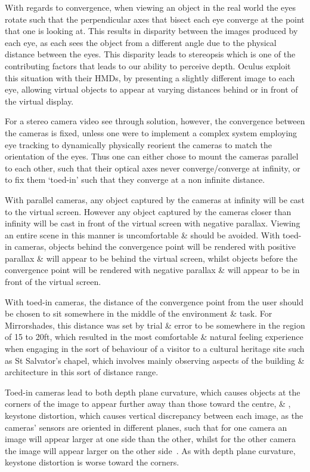 With regards to convergence, when viewing an object in the real world the eyes rotate such that the perpendicular axes that bisect each eye converge at the point that one is looking at. This results in disparity between the images produced by each eye, as each sees the object from a different angle due to the physical distance between the eyes. This disparity leads to stereopsis which is one of the contributing factors that leads to our ability to perceive depth. Oculus exploit this situation with their HMDs, by presenting a slightly different image to each eye, allowing virtual objects to appear at varying distances behind or in front of the virtual display.

For a stereo camera video see through solution, however, the convergence between the cameras is fixed, unless one were to implement a complex system employing eye tracking to dynamically physically reorient the cameras to match the orientation of the eyes. Thus one can either chose to mount the cameras parallel to each other, such that their optical axes never converge/converge at infinity, or to fix them `toed-in' such that they converge at a non infinite distance.

With parallel cameras, any object captured by the cameras at infinity will be cast to the virtual screen. However any object captured by the cameras closer than infinity will be cast in front of the virtual screen with negative parallax. Viewing an entire scene in this manner is uncomfortable \& should be avoided. With toed-in cameras, objects behind the convergence point will be rendered with positive parallax \& will appear to be behind the virtual screen, whilst objects before the convergence point will be rendered with negative parallax \& will appear to be in front of the virtual screen.

With toed-in cameras, the distance of the convergence point from the user should be chosen to sit somewhere in the middle of the environment \& task. For Mirrorshades, this distance was set by trial \& error to be somewhere in the region of 15 to 20ft, which resulted in the most comfortable \& natural feeling experience when engaging in the sort of behaviour of a visitor to a cultural heritage site such as St Salvator's chapel, which involves mainly observing aspects of the building \& architecture in this sort of distance range.

Toed-in cameras lead to both depth plane curvature, which causes objects at the corners of the image to appear further away than those toward the centre, \& , keystone distortion, which causes vertical discrepancy between each image, as the cameras' sensors are oriented in different planes, such that for one camera an image will appear larger at one side than the other, whilst for the other camera the image will appear larger on the other side~\cite{Woods1993}. As with depth plane curvature, keystone distortion is worse toward the corners.

